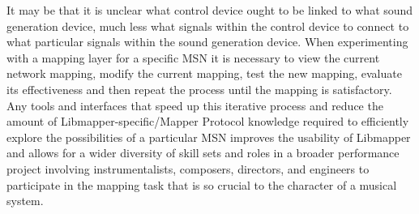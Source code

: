 It may be that it is unclear what control device ought to be linked to what sound generation device, much less what signals within the control device to connect to what particular signals within the sound generation device. When experimenting with a mapping layer for a specific MSN it is necessary to view the current network mapping, modify the current mapping, test the new mapping, evaluate its effectiveness and then repeat the process until the mapping is satisfactory. Any tools and interfaces that speed up this iterative process and reduce the amount of Libmapper-specific/Mapper Protocol knowledge required to efficiently explore the possibilities of a particular MSN improves the usability of Libmapper and allows for a wider diversity of skill sets and roles in a broader performance project involving instrumentalists, composers, directors, and engineers to participate in the mapping task that is so crucial to the character of a musical system. 

